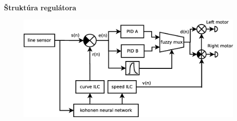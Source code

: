 \documentclass[xcolor=dvipsnames]{beamer}
\begin{document}
\begin{frame}{\bf Štruktúra regulátora}

\begin{figure}[ht]
\begin{center}
\begin{minipage}{0.8\linewidth}
\begin{center}
\includegraphics[width=1.0\textwidth]{block_diagram/robot_block.eps}
\end{center}
\end{minipage}
\end{center}
\end{figure}

\end{frame}
\end{document}
